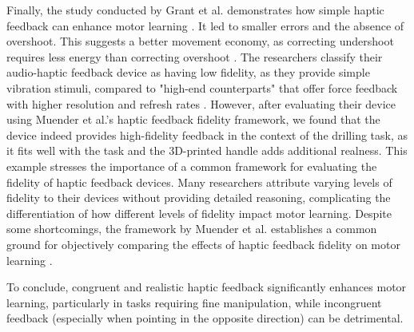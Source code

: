 Finally, the study conducted by Grant et al. demonstrates how simple haptic feedback can enhance motor learning \cite{Grant2019}. It led to smaller errors and the absence of overshoot. This suggests a better movement economy, as correcting undershoot requires less energy than correcting overshoot \cite{Grant2019}.
The researchers classify their audio-haptic feedback device as having low fidelity, as they provide simple vibration stimuli, compared to "high-end counterparts" that offer force feedback with higher resolution and refresh rates \cite{Grant2019}. However, after evaluating their device using Muender et al.'s haptic feedback fidelity framework, we found that the device indeed provides high-fidelity feedback in the context of the drilling task, as it fits well with the task and the 3D-printed handle adds additional realness. 
This example stresses the importance of a common framework for evaluating the fidelity of haptic feedback devices. Many researchers attribute varying levels of fidelity to their devices without providing detailed reasoning, complicating the differentiation of how different levels of fidelity impact motor learning. Despite some shortcomings, the framework by Muender et al. establishes a common ground for objectively comparing the effects of haptic feedback fidelity on motor learning \cite{Muender2022HapticReality}.

To conclude, congruent and realistic haptic feedback significantly enhances motor learning, particularly in tasks requiring fine manipulation, while incongruent feedback (especially when pointing in the opposite direction) can be detrimental.

\paragraph{}

